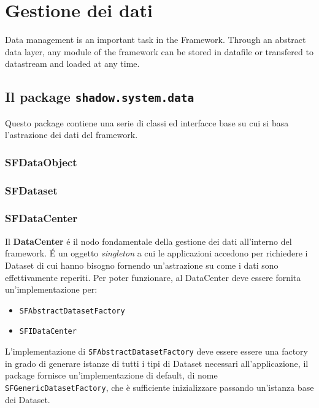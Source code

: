 %	
\chapter{Gestione dei dati}
\label{ch:gestdati}
Data management is an important task in the Framework. Through an abstract data layer, any module of the framework can be stored in datafile or transfered to datastream and loaded at any time. 

\section{Il package \texttt{shadow.system.data}}
Questo package contiene una serie di classi ed interfacce base su cui si basa l'astrazione dei dati del framework.

\subsection{SFDataObject}

\subsection{SFDataset}

\subsection{SFDataCenter}
\label{ss:sfdatacenter} 

Il \textbf{DataCenter} \'e il nodo fondamentale della gestione dei dati all'interno del framework. \'E un oggetto \textit{singleton} a cui le applicazioni accedono per richiedere i Dataset di cui hanno bisogno fornendo un'astrazione su come i dati sono effettivamente reperiti.
Per poter funzionare, al DataCenter deve essere fornita un'implementazione per:
\begin{itemize}
\item  \texttt{SFAbstractDatasetFactory}
\item  \texttt{SFIDataCenter}
\end{itemize}

L'implementazione di \texttt{SFAbstractDatasetFactory} deve essere essere una factory in grado di generare istanze di tutti i tipi di Dataset necessari all'applicazione, il package fornisce un'implementazione di default, di nome \texttt{SFGenericDatasetFactory}, che \`e sufficiente inizializzare passando un'istanza base dei Dataset.

